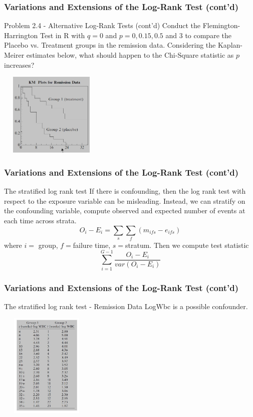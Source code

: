 \documentclass{beamer}
\theoremstyle{definition}
\begin{document}
\begin{frame}
\frametitle{Variations and Extensions of the Log-Rank Test (cont'd)}
\begin{block}{Problem 2.4 - Alternative Log-Rank Tests (cont'd)}
Conduct the Flemington-Harrington Test in R with $q=0$ and $p=0, 0.15, 0.5$ and 3 to compare the Placebo vs. Treatment groups in the remission data. Considering the Kaplan-Meirer estimates below, what should happen to the Chi-Square statistic as $p$ increases?
\end{block}
\begin{center}
         \includegraphics[width =5.0cm, height=4.0cm]{Ch2_KM_GR12.JPG}
\end{center}
\end{frame}

\begin{frame}
\frametitle{Variations and Extensions of the Log-Rank Test (cont'd)}
\begin{block}{The stratified log rank test}
If there is confounding, then the log rank test with respect to the exposure variable can be misleading. Instead, we can stratify on the confounding variable, compute observed and expected number of events at each time across strata.
\[
O_i-E_i = \sum_s \sum_f (m_{ifs} - e_{ifs})
\]
where $i=$ group, $f=$failure time, $s=$stratum.
Then we compute test statistic
\[ \sum_{i=1}^{G-1} \frac{O_i-E_i}{var(O_i-E_i)}
\]
\end{block}
\end{frame}

\begin{frame}
\frametitle{Variations and Extensions of the Log-Rank Test (cont'd)}
\begin{block}{The stratified log rank test - Remission Data}
LogWbc is a possible confounder.
\begin{center}
\includegraphics[width =4.5cm, height=5cm]{Ch1-RemissionwLogwbc.JPG}
\end{center}
\end{block}
\end{frame}
\end{document}
